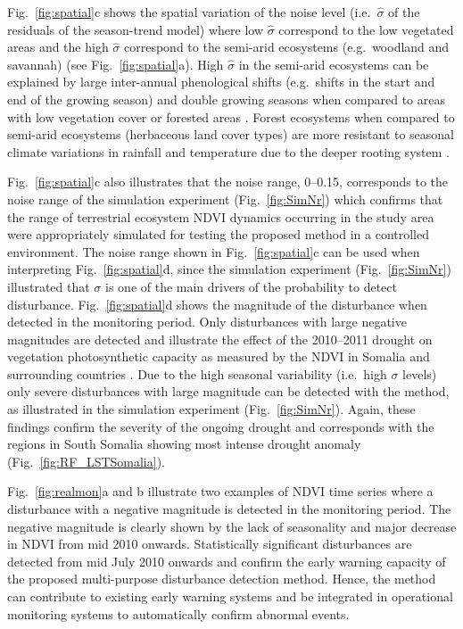 \documentclass[authoryear,preprint,review,10pt]{elsarticle}
\begin{document}
Fig.~\ref{fig:spatial}c shows the spatial variation of the noise level (i.e.\ $\hat \sigma$ of the residuals of the season-trend model) where low $\hat \sigma$ correspond to the low vegetated areas and the high $\hat \sigma$ correspond to the semi-arid ecosystems (e.g.\ woodland and savannah) (see Fig.~\ref{fig:spatial}a). High $\hat \sigma$  in the semi-arid ecosystems can be explained by large inter-annual phenological shifts (e.g.\ shifts in the start and end of the growing season) and double growing seasons when compared to areas with low vegetation cover or forested areas \citep{Verbesselt:2010wo, Brown:2010fq}. Forest ecosystems when compared to semi-arid ecosystems (herbaceous land cover types) are more resistant to seasonal climate variations in rainfall and temperature due to the deeper rooting system \citep{Verbesselt2006}. 

Fig.~\ref{fig:spatial}c also illustrates that the noise range, 0--0.15, corresponds to the noise range of the simulation experiment (Fig.~\ref{fig:SimNr}) which confirms that the range of terrestrial ecosystem NDVI dynamics occurring in the study area were appropriately simulated for testing the proposed method in a controlled environment. 
The noise range shown in Fig.~\ref{fig:spatial}c can be used when interpreting Fig.~\ref{fig:spatial}d, since the simulation experiment (Fig.~\ref{fig:SimNr}) illustrated that $\sigma$ is one of the main drivers of the probability to detect disturbance. Fig.~\ref{fig:spatial}d shows the magnitude of the disturbance when detected in the monitoring period. Only disturbances with large negative magnitudes are detected and illustrate the effect of the 2010--2011 drought on vegetation photosynthetic capacity as measured by the NDVI in Somalia and surrounding countries \citep{Funk:2011fg}. Due to the high seasonal variability (i.e.\ high $\sigma$ levels) only severe disturbances with large magnitude can be detected with the method, as illustrated in the simulation experiment (Fig.~\ref{fig:SimNr}). Again, these findings confirm the severity of the ongoing drought and corresponds with the regions in South Somalia showing most intense drought anomaly (Fig.~\ref{fig:RF_LSTSomalia}).

Fig.~\ref{fig:realmon}a and b illustrate two examples of NDVI time series where a disturbance with a negative magnitude is detected in the monitoring period. The negative magnitude is clearly shown by the lack of seasonality and major decrease in NDVI from mid 2010 onwards. Statistically significant disturbances are detected from mid July 2010 onwards and confirm the early warning capacity of the proposed multi-purpose disturbance detection method. Hence, the method can contribute to existing early warning systems and be integrated in operational monitoring systems to automatically confirm abnormal events. 
\end{document}
